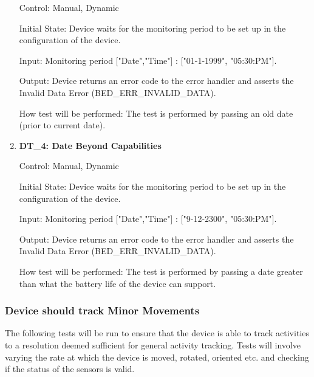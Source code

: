 \documentclass[12pt, titlepage]{article}
\begin{document}
\begin{enumerate}
		Control: Manual, Dynamic
							
		Initial State: Device waits for the monitoring period to be set up in the configuration of the device.
							
		Input: Monitoring period ["Date","Time"] : ["01-1-1999", "05:30:PM"].
							
		Output: Device returns an error code to the error handler and asserts the Invalid Data Error (BED\_ERR\_INVALID\_DATA).
		
		How test will be performed: The test is performed by passing an old date (prior to current date).

	\item{\textbf{DT\_4: Date Beyond Capabilities}\\}\label{DT4}
		
		Control: Manual, Dynamic
							
		Initial State: Device waits for the monitoring period to be set up in the configuration of the device.
							
		Input: Monitoring period ["Date","Time"] : ["9-12-2300", "05:30:PM"].
							
		Output: Device returns an error code to the error handler and asserts the Invalid Data Error (BED\_ERR\_INVALID\_DATA).

		How test will be performed: The test is performed by passing a date greater than what the battery life of the device can support.

\end{enumerate}

\subsubsection{Device should track Minor Movements}
The following tests will be run to ensure that the device is able to track activities to a resolution deemed sufficient for general activity tracking. Tests will involve varying the rate at which the device is moved, rotated, oriented etc. and checking if the status of the sensors is valid.
\end{document}
